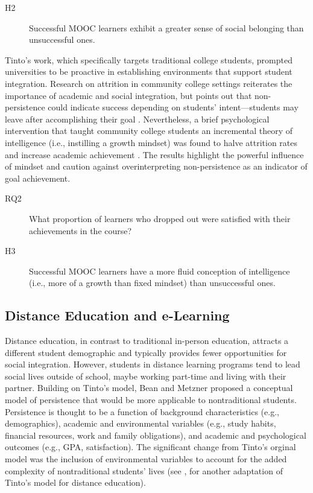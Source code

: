 \documentclass{sigchi}\usepackage[]{graphicx}\usepackage[]{color}
\begin{document}
\begin{description}
  \item[H2] Successful MOOC learners exhibit a greater sense of social belonging than unsuccessful ones.
\end{description}

Tinto's work, which specifically targets traditional college students, prompted universities to be proactive in establishing environments that support student integration. Research on attrition in community college settings reiterates the importance of academic and social integration, but points out that non-persistence could indicate success depending on students' intent---students may leave after accomplishing their goal \cite{bers1991persistence}. Nevertheless, a brief psychological intervention that taught community college students an incremental theory of intelligence (i.e., instilling a growth mindset) was found to halve attrition rates and increase academic achievement \cite{paunesku2012brief}. The results highlight the powerful influence of mindset and caution against overinterpreting non-persistence as an indicator of goal achievement.

\begin{description}
  \item[RQ2] What proportion of learners who dropped out were satisfied with their achievements in the course?
  \item[H3] Successful MOOC learners have a more fluid conception of intelligence (i.e., more of a growth than fixed mindset) than unsuccessful ones.
\end{description}

\subsection{Distance Education and e-Learning}

Distance education, in contrast to traditional in-person education, attracts a different student demographic and typically provides fewer opportunities for social integration. However, students in distance learning programs tend to lead social lives outside of school, maybe working part-time and living with their partner. Building on Tinto's model, Bean and Metzner \citeyear{bean1985conceptual} proposed a conceptual model of persistence that would be more applicable to nontraditional students. Persistence is thought to be a function of background characteristics (e.g., demographics), academic and environmental variables (e.g., study habits, financial resources, work and family obligations), and academic and psychological outcomes (e.g., GPA, satisfaction). The significant change from Tinto's orginal model was the inclusion of environmental variables to account for the added complexity of nontraditional students' lives (see \cite{kember1989longitudinal}, for another adaptation of Tinto's model for distance education).
\end{document}
